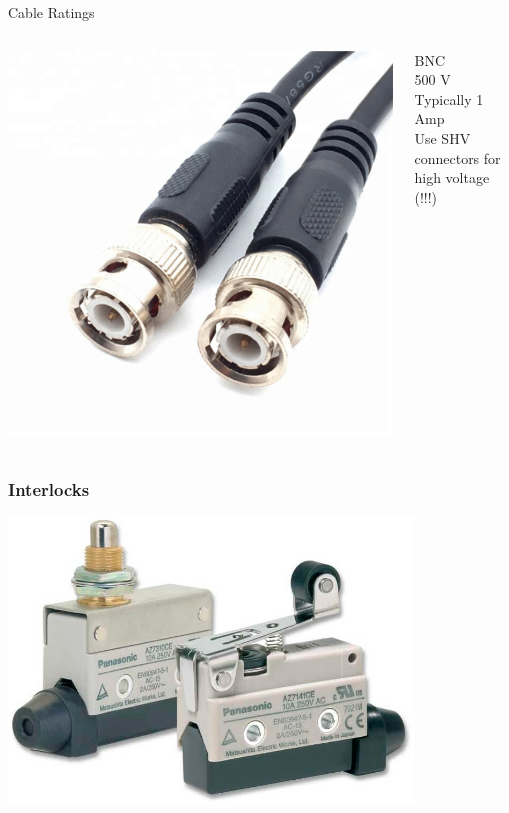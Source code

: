 \documentclass{presentation}
\begin{document}
\begin{frame}{Cable Ratings}
  \begin{columns}
    \begin{column}{0.33\textwidth}
      \includegraphics[width=\textwidth]{"./HTB1je_xKXGWBuNjy0Fbq6z4sXXad.jpg"}
    \end{column}
    \begin{column}{0.67\textwidth}
      BNC
      \\
      500 V
      \\
      Typically 1 Amp
      \\
      Use SHV connectors for high voltage (!!!)
    \end{column}
  \end{columns}
\end{frame}

\begin{frame}\frametitle{Interlocks}
  \centering
  \includegraphics[height=3in]{"./Limit-Switch.jpg"}
\end{frame}
\end{document}
